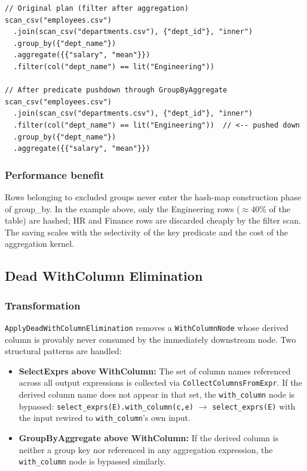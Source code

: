 \documentclass[12pt,a4paper]{article}
\begin{document}
\begin{lstlisting}
// Original plan (filter after aggregation)
scan_csv("employees.csv")
  .join(scan_csv("departments.csv"), {"dept_id"}, "inner")
  .group_by({"dept_name"})
  .aggregate({{"salary", "mean"}})
  .filter(col("dept_name") == lit("Engineering"))

// After predicate pushdown through GroupByAggregate
scan_csv("employees.csv")
  .join(scan_csv("departments.csv"), {"dept_id"}, "inner")
  .filter(col("dept_name") == lit("Engineering"))  // <-- pushed down
  .group_by({"dept_name"})
  .aggregate({{"salary", "mean"}})
\end{lstlisting}

\subsubsection*{Performance benefit}

Rows belonging to excluded groups never enter the hash-map construction
phase of group\_by.  In the example above, only the Engineering rows
($\approx\!40\%$ of the table) are hashed; HR and Finance rows are
discarded cheaply by the filter scan.  The saving scales with the
selectivity of the key predicate and the cost of the aggregation kernel.

\subsection{Dead WithColumn Elimination}

\subsubsection*{Transformation}

\texttt{ApplyDeadWithColumnElimination} removes a \texttt{WithColumnNode}
whose derived column is provably never consumed by the immediately
downstream node.  Two structural patterns are handled:

\begin{itemize}[leftmargin=1.5em]
  \item \textbf{SelectExprs above WithColumn:} The set of column names
        referenced across all output expressions is collected via
        \texttt{CollectColumnsFromExpr}.  If the derived column name does
        not appear in that set, the \texttt{with\_column} node is bypassed:
        \texttt{select\_exprs(E).with\_column(c,e)} $\to$
        \texttt{select\_exprs(E)} with the input rewired to
        \texttt{with\_column}'s own input.

  \item \textbf{GroupByAggregate above WithColumn:} If the derived column
        is neither a group key nor referenced in any aggregation expression,
        the \texttt{with\_column} node is bypassed similarly.
\end{itemize}
\end{document}

